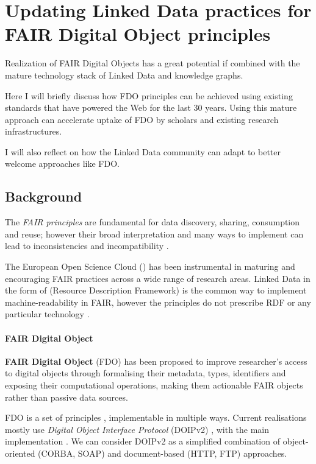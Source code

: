 \section{Updating Linked Data practices for FAIR Digital Object
principles}
\label{ch2:updating-linked-data-practices-for-fair-digital-object-principles}

Realization of FAIR Digital Objects has a great potential if combined with the mature technology stack of Linked Data and knowledge graphs.

Here I will briefly discuss how FDO principles can be achieved using existing standards that have powered the Web for the last 30 years. Using this mature approach can accelerate uptake of FDO by scholars and existing research infrastructures.

I will also reflect on how the Linked Data community can adapt to better welcome approaches like FDO.

\subsection{Background}
\label{ch2:background}

The \emph{FAIR principles} \cite{Wilkinson 2016} are
fundamental for data discovery, sharing, consumption and reuse; however
their broad interpretation and many ways to implement can lead to
inconsistencies and incompatibility
\cite{Jacobsen 2020}.

The European Open Science Cloud () has
been instrumental in maturing and encouraging FAIR practices across a
wide range of research areas. Linked Data in the form of
 (Resource Description
Framework) is the common way to implement machine-readability in FAIR,
however the principles do not prescribe RDF or any particular technology
\cite{Mons 2017}.

\paragraph{FAIR Digital Object}
\label{ch2:fair-digital-object}

\textbf{FAIR Digital Object} (FDO)
\cite{Schultes 2019}
has been proposed to improve researcher's access to digital objects
through formalising their metadata, types, identifiers and exposing
their computational operations, making them actionable FAIR objects
rather than passive data sources.

FDO is a set of principles \cite{bonino2019}, implementable in multiple ways. Current realisations mostly
use \emph{Digital Object Interface Protocol} (DOIPv2)
\cite{DONA 2018}, with the
main implementation
. We
can consider DOIPv2 as a simplified combination of object-oriented
(CORBA, SOAP) and document-based (HTTP, FTP) approaches.


